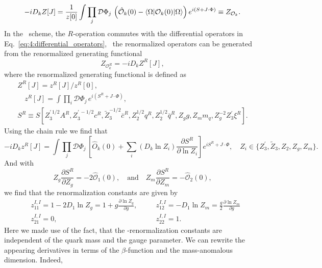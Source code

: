\begin{equation}
-i D_k Z[J] = \frac{1}{z[0]}\int \prod_j \mathcal{D} \Phi_j \, \left(\hat{\mathcal{O}}_k(0) - \braket{\Omega | \mathcal{O}_k(0) |\Omega} \right) e^{i (S + J \cdot \Phi)} \equiv Z_{\mathcal{O}_k}.
\end{equation}
In the \MS\ scheme, the $R$-operation commutes with the differential operators in Eq.~\eqref{eq:4:differential_operators}, \ie\ the renormalized operators can be generated from the renormalized generating functional
\begin{equation}
Z_{\mathcal{O}_k^R} = -i D_k Z^R[J],
\end{equation}
where the renormalized generating functional is defined as
\begin{equation}
\begin{gathered}
Z^R[J] = z^R[J]/z^R[0] ,\\
\quad z^R[J] = \int \prod_i \mathcal{D}\Phi_j \, e^{i(S^R + J \cdot \Phi)}, \\
S^R \equiv S[Z_3^{\prime\, 1/2} A^R, Z_3^{\prime\, -1/2} c^R, \tilde{Z}_3^{-1/2}\bar{c}^R, Z_2^{1/2} q^R, Z_2^{1/2} \bar{q}^R, Z_g g, Z_m m_q, Z_g^{-2} Z_3^\prime \xi^R].
\end{gathered}
\end{equation}
Using the chain rule we find that
\begin{equation}
-i D_k z^R[J] = \int \prod_j \mathcal{D} \Phi_j \, \left[ \hat{O}_k(0) + \sum_i (D_k \ln Z_i)  \frac{\partial S^R}{\partial \ln Z_i}\right] e^{i S^R + J \cdot \Phi}, \quad Z_i \in \big \lbrace Z_3^\prime , \tilde{Z}_3, Z_2, Z_g, Z_m \big \rbrace.
\end{equation}
And with
\begin{equation}
Z_g \frac{\partial S^R}{\partial Z_g} = - 2 \hat{\mathcal{O}}_1(0), \quad \text{and} \quad Z_m \frac{\partial S^R}{\partial Z_m} = - \hat{\mathcal{O}}_2(0),
\end{equation}
we find that the renormalization constants are given by
\begin{equation}
\begin{alignedat}{2}
&z^{I,I}_{11} = 1 - 2 D_1 \ln Z_g = 1 + g\frac{\partial \ln Z_g}{\partial g}, \quad &&z^{I,I}_{12} = - D_1 \ln Z_m = \frac{g}{2} \frac{\partial \ln Z_m}{\partial g} \\
&z^{I,I}_{21} = 0, \quad &&z^{I,I}_{22} = 1.
\end{alignedat}
\end{equation}
Here we made use of the fact, that the \MS-renormalization constants are independent of the quark mass and the gauge parameter. We can rewrite the appearing derivatives in terms of the $\beta$-function and the mass-anomalous dimension. Indeed,

